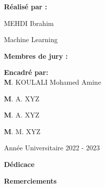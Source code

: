 \documentclass[a4paper,12 pt,twoside]{report}
\begin{document}
\begin{titlepage}
\begin {center}
\end {center}

        \vfill
\begin{center}
        \textbf {Réalisé par :}\bigskip

            MEHDI Ibrahim
\end{center}



        \vfill

\begin {center}

        \hrulefill\par
        \LARGE Machine Learning\par
        \hrulefill\par

\end {center}

        \vfill

        \textbf {Membres de jury :}\hfill\parbox[t]{4cm}{\textbf{Encadré par:\\}\textbf{M}. KOULALI Mohamed Amine}\par
        \textbf {M}. A. XYZ\par
        \textbf {M}. A. XYZ\par
        \textbf {M}. M. XYZ\par

        \vfill


\begin {center}
    Année Universitaire 2022 - 2023
\end {center}

\end{titlepage}

\newpage
\thispagestyle {empty}
    \begin {center}
    \Large\textbf {Dédicace}
    \end {center}

\newpage
\thispagestyle {empty}
    \begin {center}
    \Large\textbf {Remerciements}
    \end {center}

\newpage

   \begin {abstract}

   \end {abstract}

\newpage
    \begin {abstract}

    \end {abstract}
\end{document}
